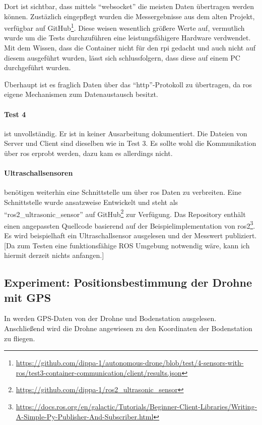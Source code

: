 Dort ist sichtbar, dass mittels \enquote{websocket} die meisten Daten übertragen werden können. Zustäzlich eingepflegt wurden die Messergebnisse aus dem alten Projekt, verfügbar auf GitHub\footnote{\url{https://github.com/dippa-1/autonomous-drone/blob/test/4-sensors-with-ros/test3-container-communication/client/results.json}}. Diese weisen wesentlich größere Werte auf, vermutlich wurde um die Tests durchzuführen eine leistungsfähigere Hardware verdwendet. Mit dem Wissen, dass die Container nicht für den \gls{rpi} gedacht und auch nicht auf diesem ausgeführt wurden, lässt sich schlussfolgern, dass diese auf einem PC durchgeführt wurden.

Überhaupt ist es fraglich Daten über das \enquote{http}-Protokoll zu übertragen, da \gls{ros} eigene Mechanismen zum Datenaustausch besitzt.

\paragraph*{Test 4} ist unvollständig. Er ist in keiner Ausarbeitung dokumentiert. Die Dateien von Server und Client sind dieselben wie in Test 3. Es sollte wohl die Kommunikation über \acrshort{ros} erprobt werden, dazu kam es allerdings nicht.

\paragraph*{Ultraschallsensoren} benötigen weiterhin eine Schnittstelle um über \acrshort{ros} Daten zu verbreiten. Eine Schnittstelle wurde ansatzweise Entwickelt und steht als \enquote{ros2\_ultrasonic\_sensor} auf GitHub\footnote{\url{https://github.com/dippa-1/ros2_ultrasonic_sensor}} zur Verfügung. Das Repository enthält einen angepassten Quellcode basierend auf der Beispielimplementation von \acrshort{ros}2\footnote{\url{https://docs.ros.org/en/galactic/Tutorials/Beginner-Client-Libraries/Writing-A-Simple-Py-Publisher-And-Subscriber.html}}. Es wird beispielhaft ein Ultraschallsensor ausgelesen und der Messwert publiziert.
[Da zum Testen eine funktionsfähige ROS Umgebung notwendig wäre, kann ich hiermit derzeit nichts anfangen.]

\subsection{Experiment: Positionsbestimmung der Drohne mit GPS}
In \cite[Kapitel 6.10; 7.4 und folgende]{wirthErweiterungBestehendenDrohne2022a} werden GPS-Daten von der Drohne und Bodenstation ausgelesen. Anschließend wird die Drohne angewiesen zu den Koordinaten der Bodenstation zu fliegen.


